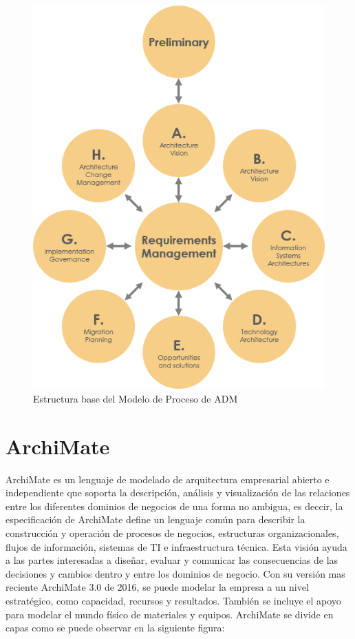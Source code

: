 \begin{figure}[h]
	\centering
	\includegraphics[width=0.7\linewidth]{arquitectura/imagenes/modeloADM}
	\caption{Estructura base del Modelo de Proceso de ADM }
	\label{fig:modeloadm}
\end{figure}
\newpage


\section{ArchiMate}

ArchiMate es un lenguaje de modelado de arquitectura empresarial abierto e independiente que soporta la descripción, análisis y visualización de las relaciones entre los diferentes dominios de negocios de una forma no ambigua, es deccir, la especificación de ArchiMate define un lenguaje común para describir la construcción y operación de procesos de negocios, estructuras organizacionales, flujos de información, sistemas de TI e infraestructura técnica. Esta visión ayuda a las partes interesadas a diseñar, evaluar y comunicar las consecuencias de las decisiones y cambios dentro y entre los dominios de negocio.  
\newline
Con su versión mas reciente ArchiMate 3.0 de 2016, se puede modelar la empresa a un nivel estratégico, como capacidad, recursos y resultados. También se incluye el apoyo para modelar el mundo físico de materiales y equipos.
\newline
ArchiMate se divide en capas como se puede observar en la siguiente figura:
\newline

